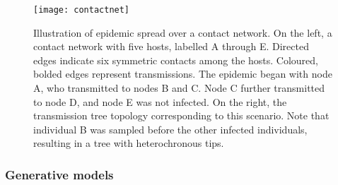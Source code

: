 \begin{figure}[ht]
  \centering
  \label{fig:contactnet}
  \texttt{[image: contactnet]}
  \caption[Illustration of a epidemic spread over a contact network]
  {Illustration of epidemic spread over a contact network. On the left, a
   contact network with five hosts, labelled A through E. Directed edges
   indicate six symmetric contacts among the hosts. Coloured, bolded edges
   represent transmissions. The epidemic began with node A, who transmitted to
   nodes B and C. Node C further transmitted to node D, and node E was not
   infected. On the right, the transmission tree topology corresponding to this
   scenario. Note that individual B was sampled before the other infected
   individuals, resulting in a tree with heterochronous tips.}
\end{figure}

\subsubsection{Generative models}
\label{subsubsec:generative}


